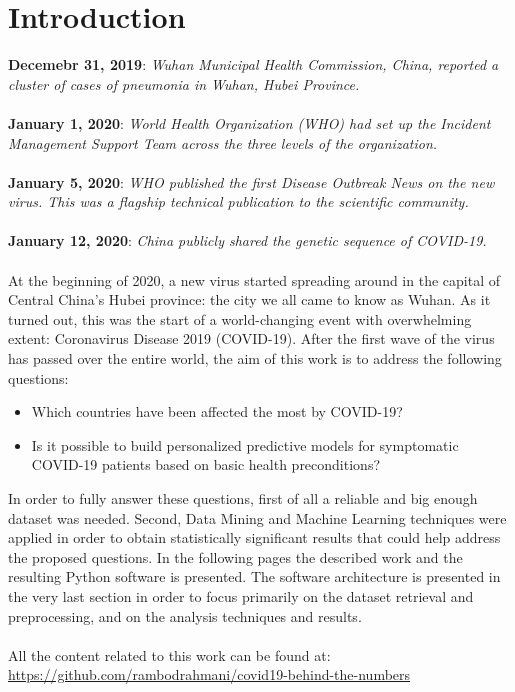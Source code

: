 \documentclass[11pt,a4paper]{article}
\begin{document}
\section{Introduction}
\textbf{Decemebr 31, 2019}: \textit{Wuhan Municipal Health Commission, China,
reported a cluster of cases of pneumonia in Wuhan, Hubei Province.}\\
\\
\textbf{January 1, 2020}: \textit{World Health Organization (WHO) had set up the
Incident Management Support Team across the three levels of the organization.}\\
\\
\textbf{January 5, 2020}: \textit{WHO published the first Disease Outbreak News
on the new virus. This was a flagship technical publication to the scientific
community.}\\
\\
\textbf{January 12, 2020}: \textit{China publicly shared the genetic sequence of
COVID-19.}\\
\\
At the beginning of 2020, a new virus started spreading around in the capital of
Central China's Hubei province: the city we all came to know as Wuhan. As it
turned out, this was the start of a world-changing event with overwhelming
extent: Coronavirus Disease 2019 (COVID-19). After the first wave of the virus
has passed over the entire world, the aim of this work is to address the
following questions:
\begin{itemize}
	\item Which countries have been affected the most by COVID-19?
	\item Is it possible to build personalized predictive models for
		symptomatic COVID-19 patients based on basic health preconditions?
\end{itemize}
In order to fully answer these questions, first of all a reliable and big enough
dataset was needed. Second, Data Mining and Machine Learning techniques were
applied in order to obtain statistically significant results that could help
address the proposed questions. In the following pages the described work and
the resulting Python software is presented. The software architecture is
presented in the very last section in order to focus primarily on the dataset
retrieval and preprocessing, and on the analysis techniques and results.\\
\\
All the content related to this work can be found at:
\url{https://github.com/rambodrahmani/covid19-behind-the-numbers}
\end{document}
